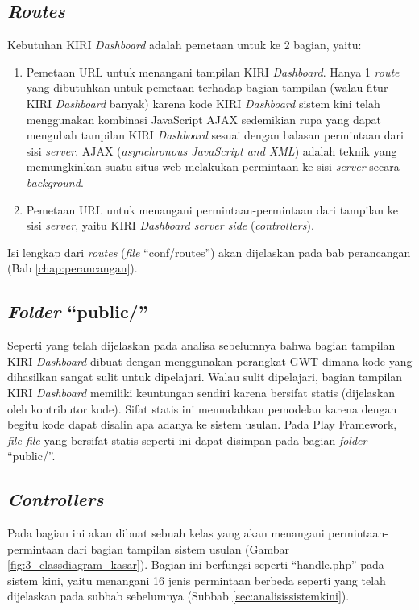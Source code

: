 \subsection{\textit{Routes}}
\label{sec:routesusulan}
Kebutuhan KIRI \textit{Dashboard} adalah pemetaan untuk ke 2 bagian, yaitu:
\begin{enumerate}
	\item Pemetaan URL untuk menangani tampilan KIRI \textit{Dashboard}. Hanya 1 \textit{route} yang dibutuhkan untuk pemetaan terhadap bagian tampilan (walau fitur KIRI \textit{Dashboard} banyak) karena kode KIRI \textit{Dashboard} sistem kini telah menggunakan kombinasi JavaScript  AJAX sedemikian rupa yang dapat mengubah tampilan KIRI \textit{Dashboard} sesuai dengan balasan permintaan dari sisi \textit{server}. AJAX (\textit{asynchronous JavaScript and XML}) adalah teknik yang memungkinkan suatu situs web melakukan permintaan ke sisi \textit{server} secara \textit{background}\cite{w3schools}.
	\item Pemetaan URL untuk menangani permintaan-permintaan dari tampilan ke sisi \textit{server}, yaitu KIRI \textit{Dashboard server side} (\textit{controllers}).
\end{enumerate}

Isi lengkap dari \textit{routes} (\textit{file} ``conf/routes'') akan dijelaskan pada bab perancangan (Bab \ref{chap:perancangan}).

\subsection{\textit{Folder} ``public/''}
\label{sec:folderpublic}
Seperti yang telah dijelaskan pada analisa sebelumnya bahwa bagian tampilan KIRI \textit{Dashboard} dibuat dengan menggunakan perangkat GWT dimana kode yang dihasilkan sangat sulit untuk dipelajari. Walau sulit dipelajari, bagian tampilan KIRI \textit{Dashboard} memiliki keuntungan sendiri karena bersifat statis (dijelaskan oleh kontributor kode). Sifat statis ini memudahkan pemodelan karena dengan begitu kode dapat disalin apa adanya ke sistem usulan. Pada Play Framework, \textit{file-file} yang bersifat statis seperti ini dapat disimpan pada bagian \textit{folder} ``public/''.

\subsection{\textit{Controllers}}
\label{sec:controllerusulan}
Pada bagian ini akan dibuat sebuah kelas yang akan menangani permintaan-permintaan dari bagian tampilan sistem usulan (Gambar \ref{fig:3_classdiagram_kasar}). Bagian ini berfungsi seperti ``handle.php'' pada sistem kini, yaitu menangani 16 jenis permintaan berbeda seperti yang telah dijelaskan pada subbab sebelumnya (Subbab \ref{sec:analisissistemkini}).

